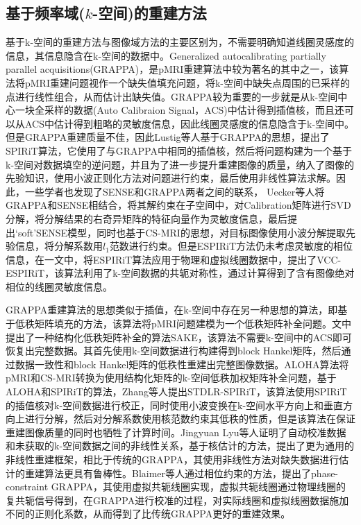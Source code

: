 \documentclass[lang=cn,11pt,a4paper,cite=numbers]{elegantpaper}
\begin{document}
\subsection{基于频率域($k$-空间)的重建方法}
\par 基于k-空间的重建方法与图像域方法的主要区别为，不需要明确知道线圈灵感度的信息，其信息隐含在k-空间的数据中。Generalized autocalibrating partially parallel acquisitions(GRAPPA)\cite{griswold2002generalized}，是pMRI重建算法中较为著名的其中之一，该算法将pMRI重建问题视作一个缺失值填充问题，将k-空间中缺失点周围的已采样的点进行线性组合，从而估计出缺失值。GRAPPA较为重要的一步就是从k-空间中心一块全采样的数据(Auto Calibraion Signal，ACS)中估计得到插值核，而且还可以从ACS中估计得到粗略的灵敏度信息，因此线圈灵感度的信息隐含于k-空间中。但是GRAPPA重建质量不佳，因此Lustig等人基于GRAPPA的思想，提出了SPIRiT\cite{lustig2010spirit}算法，它使用了与GRAPPA中相同的插值核，然后将问题构建为一个基于k-空间对数据填空的逆问题，并且为了进一步提升重建图像的质量，纳入了图像的先验知识，使用小波正则化方法对问题进行约束，最后使用非线性算法求解。因此，一些学者也发现了SENSE和GRAPPA两者之间的联系， Uecker\cite{uecker2014espirit}等人将GRAPPA和SENSE相结合，将其解约束在子空间中，对Calibration矩阵进行SVD分解，将分解结果的右奇异矩阵的特征向量作为灵敏度信息，最后提出‘soft’SENSE模型，同时也基于CS-MRI的思想，对目标图像使用小波分解提取先验信息，将分解系数用$l_1$范数进行约束。但是ESPIRiT方法仍未考虑灵敏度的相位信息，在\cite{uecker2017estimating}一文中，将ESPIRiT算法应用于物理和虚拟线圈数据中，提出了VCC-ESPIRiT，该算法利用了k-空间数据的共轭对称性，通过计算得到了含有图像绝对相位的线圈灵敏度信息。
\par GRAPPA重建算法的思想类似于插值，在k-空间中存在另一种思想的算法，即基于低秩矩阵填充的方法，该算法将pMRI问题建模为一个低秩矩阵补全问题。文\cite{shin2014calibrationless}中提出了一种结构化低秩矩阵补全的算法SAKE，该算法不需要k-空间中的ACS即可恢复出完整数据。其首先使用k-空间数据进行构建得到block Hankel矩阵，然后通过数据一致性和block Hankel矩阵的低秩性重建出完整图像数据。ALOHA\cite{7547372}算法将pMRI和CS-MRI转换为使用结构化矩阵的k-空间低秩加权矩阵补全问题，基于ALOHA和SPIRiT的算法，Zhang等人提出STDLR-SPIRiT，该算法使用SPIRiT的插值核对k-空间数据进行校正，同时使用小波变换在k-空间水平方向上和垂直方向上进行分解，然后对分解系数使用核范数约束其低秩的性质，但是该算法在保证重建图像质量的同时也牺牲了计算时间。Jingyuan Lyu\cite{8428648}等人证明了自动校准数据和未获取的k-空间数据之间的非线性关系，基于核估计的方法，提出了更为通用的非线性重建框架，相比于传统的GRAPPA，其使用非线性方法对缺失数据进行估计的重建算法更具有鲁棒性。Blaimer\cite{blaimer2014regularization}等人通过相位约束的方法，提出了phase-constraint GRAPPA，其使用虚拟共轭线圈实现，虚拟共轭线圈通过物理线圈的复共轭信号得到，在GRAPPA进行校准的过程，对实际线圈和虚拟线圈数据施加不同的正则化系数，从而得到了比传统GRAPPA更好的重建效果。
\end{document}
